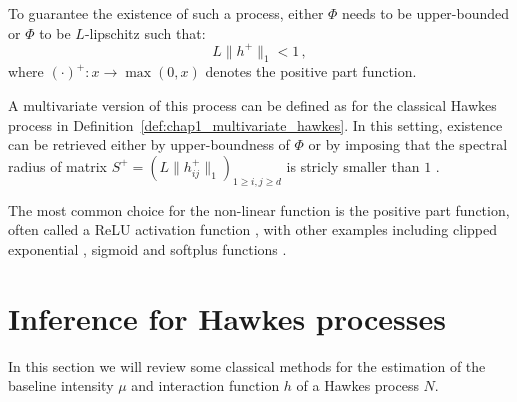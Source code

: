 To guarantee the existence of such a process, either $\Phi$ needs to be upper-bounded or $\Phi$ to be $L$-lipschitz such that:
\[L\|h^+\|_1 < 1\,,\]
where $(\cdot)^+\colon x \to \max(0, x)$ denotes the positive part function.

A multivariate version of this process can be defined as for the classical Hawkes process in Definition~\ref{def:chap1_multivariate_hawkes}.
In this setting, existence can be retrieved either by upper-boundness of $\Phi$ or by imposing that the spectral radius of matrix $S^+ = (L \|h_{ij}^+\|_1)_{1 \geq i,j \geq d}$ is stricly smaller than $1$ \parencite[Lemma 2.1]{Sulem2024}.

The most common choice for the non-linear function is the positive part function, often called a ReLU activation function \parencite{Lemonnier2014, Lu2018, Costa2020}, with other examples including clipped exponential \parencite{Chornoboy1988, Carstensen2010}, sigmoid \parencite{Menon2018} and softplus functions \parencite{Mei2017}.

\section{Inference for Hawkes processes}\label{sec:chap1_inference}


In this section we will review some classical methods for the estimation of the baseline intensity $\mu$ and interaction function $h$ of a Hawkes process $N$.

